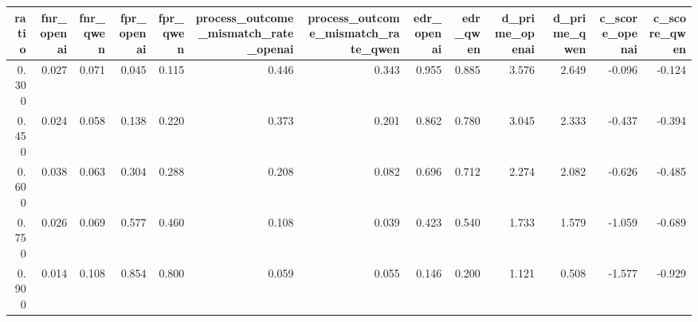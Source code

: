 \begin{tabular}{rrrrrrrrrrrrr}
\toprule
ratio & fnr_openai & fnr_qwen & fpr_openai & fpr_qwen & process_outcome_mismatch_rate_openai & process_outcome_mismatch_rate_qwen & edr_openai & edr_qwen & d_prime_openai & d_prime_qwen & c_score_openai & c_score_qwen \\
\midrule
0.300 & 0.027 & 0.071 & 0.045 & 0.115 & 0.446 & 0.343 & 0.955 & 0.885 & 3.576 & 2.649 & -0.096 & -0.124 \\
0.450 & 0.024 & 0.058 & 0.138 & 0.220 & 0.373 & 0.201 & 0.862 & 0.780 & 3.045 & 2.333 & -0.437 & -0.394 \\
0.600 & 0.038 & 0.063 & 0.304 & 0.288 & 0.208 & 0.082 & 0.696 & 0.712 & 2.274 & 2.082 & -0.626 & -0.485 \\
0.750 & 0.026 & 0.069 & 0.577 & 0.460 & 0.108 & 0.039 & 0.423 & 0.540 & 1.733 & 1.579 & -1.059 & -0.689 \\
0.900 & 0.014 & 0.108 & 0.854 & 0.800 & 0.059 & 0.055 & 0.146 & 0.200 & 1.121 & 0.508 & -1.577 & -0.929 \\
\bottomrule
\end{tabular}
